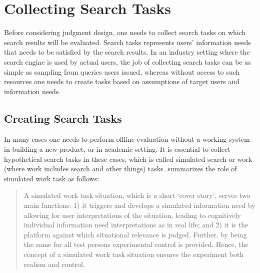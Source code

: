 \documentclass[openany]{now} %
\begin{document}


\section{Collecting Search Tasks}
Before considering judgment design, one needs to collect search tasks on which search results will be evaluated. Search tasks represents users' information needs that needs to be satisfied by the search results. In an industry setting where the search engine is used by actual users, the job of collecting search tasks can be as simple as sampling from queries users issued, whereas without access to such resources one needs to create tasks based on assumptions of target users and information needs. 

\subsection{Creating Search Tasks}
In many cases one needs to perform offline evaluation without a working system -- in building a new product, or in academic setting. It is essential to collect hypothetical search tasks in these cases, which is called simulated search or work (where work includes search and other things) tasks. \cite{Borlund:2003} summarizes the role of  simulated work task as follows:


\begin{quote}
A simulated work task situation, which is a short `cover story', serves two main functions: 1) it triggers and develops a simulated information need by allowing for user interpretations of the situation, leading to cognitively individual information need interpretations as in real life; and 2) it is the platform against which situational relevance is judged. Further, by being the same for all test persons experimental control is provided. Hence, the concept of a simulated work task situation ensures the experiment both realism and control.	
\end{quote}
\end{document}
